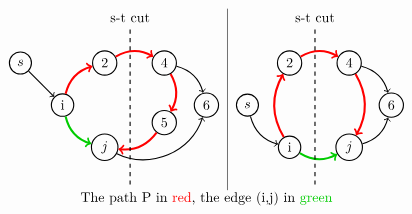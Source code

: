\[\begin{tabular}{c|c}
    \begin{tikzpicture}[node distance={15mm}, thick , main/.style = {draw, circle}] 
    
    \node[main] (1) {i};
    \node[main] (0) [above left of = 1] {$s$};
    \node[main] (2) [above right of=1] {$2$};
    \node[main] (3) [below right of=1] {$j$};
    \node[main] (4) [right of=2] {$4$};
    \node[main] (6) [below right of=4] {$6$};
    \node[main] (5) [below of=4] {$5$};
    \draw[->] (0) to (1);
    \draw[->,line width=1.5 pt] (1)[red, bend left] to (2);
    \draw[->,line width=1.5 pt] (1)[green!80!black, bend right] to (3);
    \draw[->,line width=1.5 pt] (2)[red, bend left] to (4);
    \draw[->,line width=1.5 pt] (4)[red,bend left] to (5);
    \draw[->] (4)[bend left] to (6);
    \draw[->] (3)[bend right = 50] to (6);
    \draw[->,line width=1.5 pt] (5)[red,bend left] to (3);

    \draw[dashed] (1.7,-2) -- (1.7,2);
    \node at (1.7,2.2) {s-t\ cut};

\end{tikzpicture}& 
\begin{tikzpicture}[node distance={15mm}, thick , main/.style = {draw, circle}] 
    
    
    \node[main] (0) {$s$};
    \node[main] (1) [below right of = 0] {i};
    \node[main] (2) [above right of=0] {$2$};
    \node[main] (4) [right of=2] {$4$};
    \node[main] (6) [below right of=4] {$6$};
    \node[main] (3) [below left of=6] {$j$};
    \draw[->] (0)[bend right] to (1);
    \draw[->,line width=1.5 pt] (1)[red, bend left] to (2);
    \draw[->,line width=1.5 pt] (1)[green!80!black, bend right] to (3);
    \draw[->,line width=1.5 pt] (2)[red, bend left] to (4);
    \draw[->,line width=1.5 pt] (4)[red, bend left] to (3);
    
    \draw[->] (4)[bend left] to (6);
    \draw[->] (3)[bend right] to (6);


    \draw[dashed] (1.7,-2) -- (1.7,2);
    \node at (1.7,2.2) {s-t\ cut};

\end{tikzpicture}\\
    \multicolumn{2}{c}{The path P in {\color{red}{red}}, the edge (i,j) in {\color{green!80!black}{green}} }

\end{tabular}\]

